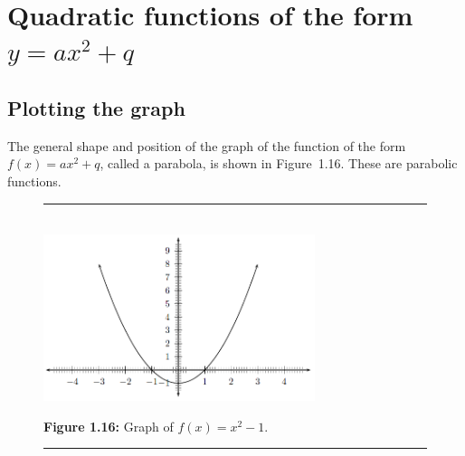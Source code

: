 % 
%     
%     
%     
\par 

\section{Quadratic functions of the form $y=a{x}^{2}+q$}
\nopagebreak	

\subsection*{Plotting the graph}         
The general shape and position of the graph of the function of the form $f(x)=a{x}^{2}+q$, called a parabola, is shown in Figure~1.16. These are parabolic functions.\par 

\setcounter{subfigure}{0}
\begin{figure}[H] %
\begin{center}
\rule[.1in]{\figurerulewidth}{.005in} \\
\label{m39345*uid102!!!underscore!!!media}\label{m39345*uid102!!!underscore!!!printimage}\includegraphics[width=300px]{col11306.imgs/m39345_MG10C11_013.png} %
\vspace{2pt}
\vspace{\rubberspace}\par \begin{cnxcaption}
\small \textbf{Figure 1.16: }Graph of $f(x)={x}^{2}-1$.
\end{cnxcaption}
\vspace{.1in}
\rule[.1in]{\figurerulewidth}{.005in} \\
\end{center}
\end{figure}       

